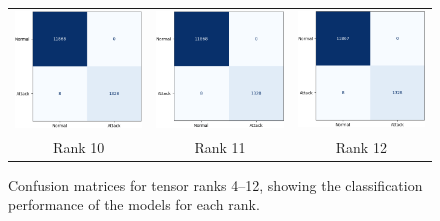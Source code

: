 \documentclass[pdflatex,sn-mathphys-num]{sn-jnl}
\theoremstyle{thmstyleone}
\theoremstyle{thmstyletwo}
\theoremstyle{thmstylethree}
\begin{document}
\begin{figure}[H]
\begin{tabular}{ccc}
        \includegraphics[width=0.3\linewidth]{rank_10.png} &
        \includegraphics[width=0.3\linewidth]{rank_11.png} &
        \includegraphics[width=0.3\linewidth]{rank_12.png} \\
        \small Rank 10 & \small Rank 11 & \small Rank 12
    \end{tabular}
    \caption{Confusion matrices for tensor ranks 4–12, showing the classification performance of the models for each rank.}
    \label{fig:confusion_matrices_2}
\end{figure}
\end{document}
